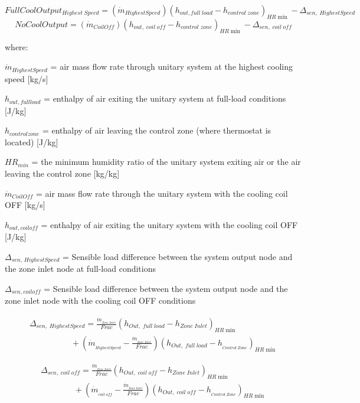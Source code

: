\[FullCoolOutpu{t_{Highest\;Speed}} = ({\dot m_{HighestSpeed}}){({h_{out,full\;load}} - {h_{control\;zone}})_{HR\min }} - {\Delta_{sen,\;HighestSpeed}}\] \[NoCoolOutput = ({\dot m_{CoilOff}}){({h_{out,\;coil\;off}} - {h_{control\;zone}})_{HR\min }} - {\Delta_{sen,\;coil\;off}}\]

where:

\({\dot m_{HighestSpeed}}\) = air mass flow rate through unitary system at the highest cooling speed {[}kg/s{]}

\(h_{out,full load}\) = enthalpy of air exiting the unitary system at full-load conditions {[}J/kg{]}

\(h_{control zone}\) = enthalpy of air leaving the control zone (where thermostat is located) {[}J/kg{]}

\(HR_{min}\) = the minimum humidity ratio of the unitary system exiting air or the air leaving the control zone {[}kg/kg{]}

\({\dot m_{CoilOff}}\) = air mass flow rate through the unitary system with the cooling coil OFF {[}kg/s{]}

\(h_{out,coil off}\) = enthalpy of air exiting the unitary system with the cooling coil OFF {[}J/kg{]}

\(\Delta_{sen,\,HighestSpeed}\) = Sensible load difference between the system output node and the zone inlet node at full-load conditions

\(\Delta_{sen,coil off}\) = Sensible load difference between the system output node and the zone inlet node with the cooling coil OFF conditions

\begin{equation}
\begin{array}{l}
{\Delta_{sen,\;HighestSpeed}} = \frac{{{{\dot m}_{_{Zone\;Inlet}}}}}{{Frac}}{\left( {{h_{Out,\;full\;load}} - {h_{Zone\;Inlet}}} \right)_{HR\min }}\\\quad \quad \quad \quad \quad  + \left( {{{\dot m}_{_{HighestSpeed}}} - \frac{{{{\dot m}_{_{Zone\;Inlet}}}}}{{Frac}}} \right){\left( {{h_{Out,\;full\;load}} - {h_{_{Control\;Zone}}}} \right)_{HR\min }}
\end{array}
\end{equation}

\begin{equation}
\begin{array}{l}
{\Delta_{sen,\;coil\;off}} = \frac{{{{\dot m}_{_{Zone\;Inlet}}}}}{{Frac}}{\left( {{h_{Out,\;coil\;off}} - {h_{Zone\;Inlet}}} \right)_{HR\min }}\\\quad \quad \quad \quad  + \left( {{{\dot m}_{_{coil\;off}}} - \frac{{{{\dot m}_{_{Zone\;Inlet}}}}}{{Frac}}} \right){\left( {{h_{Out,\;coil\;off}} - {h_{_{Control\;Zone}}}} \right)_{HR\min }}
\end{array}
\end{equation}

